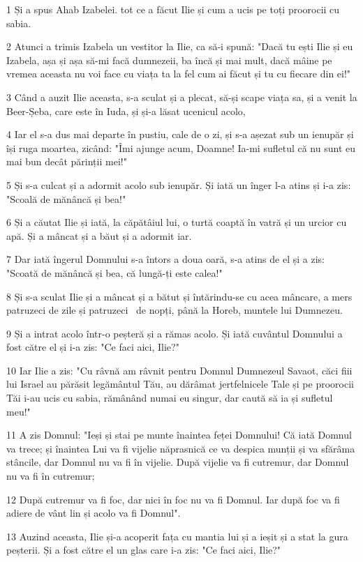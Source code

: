 \par 1 Și a spus Ahab Izabelei. tot ce a făcut Ilie și cum a ucis pe toți proorocii cu sabia.
\par 2 Atunci a trimis Izabela un vestitor la Ilie, ca să-i spună: "Dacă tu ești Ilie și eu Izabela, așa și așa să-mi facă dumnezeii, ba încă și mai mult, dacă mâine pe vremea aceasta nu voi face cu viața ta la fel cum ai făcut și tu cu fiecare din ei!"
\par 3 Când a auzit Ilie aceasta, s-a sculat și a plecat, să-și scape viața sa, și a venit la Beer-Șeba, care este în Iuda, și și-a lăsat ucenicul acolo,
\par 4 Iar el s-a dus mai departe în pustiu, cale de o zi, și s-a așezat sub un ienupăr și își ruga moartea, zicând: "Îmi ajunge acum, Doamne! Ia-mi sufletul că nu sunt eu mai bun decât părinții mei!"
\par 5 Și s-a culcat și a adormit acolo sub ienupăr. Și iată un înger l-a atins și i-a zis: "Scoală de mănâncă și bea!"
\par 6 Și a căutat Ilie și iată, la căpătâiul lui, o turtă coaptă în vatră și un urcior cu apă. Și a mâncat și a băut și a adormit iar.
\par 7 Dar iată îngerul Domnului s-a întors a doua oară, s-a atins de el și a zis: "Scoată de mănâncă și bea, că lungă-ți este calea!"
\par 8 Și s-a sculat Ilie și a mâncat și a bătut și întărindu-se cu acea mâncare, a mers patruzeci de zile și patruzeci  de nopți, până la Horeb, muntele lui Dumnezeu.
\par 9 Și a intrat acolo într-o peșteră și a rămas acolo. Și iată cuvântul Domnului a fost către el și i-a zis: "Ce faci aici, Ilie?"
\par 10 Iar Ilie a zis: "Cu râvnă am râvnit pentru Domnul Dumnezeul Savaot, căci fiii lui Israel au părăsit legământul Tău, au dărâmat jertfelnicele Tale și pe proorocii Tăi i-au ucis cu sabia, rămânând numai eu singur, dar caută să ia și sufletul meu!"
\par 11 A zis Domnul: "Ieși și stai pe munte înaintea feței Domnului! Că iată Domnul va trece; și înaintea Lui va fi vijelie năprasnică ce va despica munții și va sfărâma stâncile, dar Domnul nu va fi în vijelie. După vijelie va fi cutremur, dar Domnul nu va fi în cutremur;
\par 12 După cutremur va fi foc, dar nici în foc nu va fi Domnul. Iar după foc va fi adiere de vânt lin și acolo va fi Domnul".
\par 13 Auzind aceasta, Ilie și-a acoperit fața cu mantia lui și a ieșit și a stat la gura peșterii. Și a fost către el un glas care i-a zis: "Ce faci aici, Ilie?"
